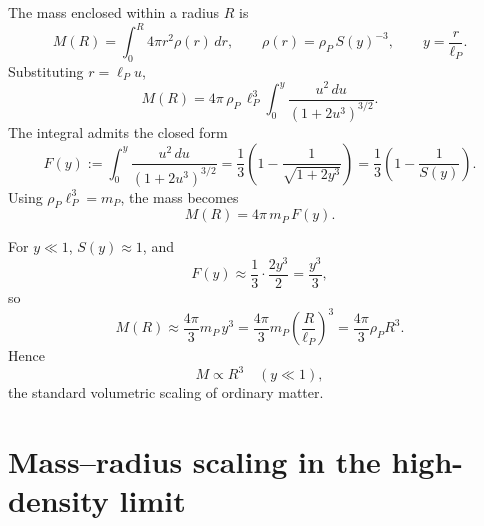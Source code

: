 \documentclass[a4paper,7pt,oneside,openany]{book}
\begin{document}
The mass enclosed within a radius $R$ is
\begin{equation}
M(R)=\int_{0}^{R}4\pi r^{2}\rho(r)\,dr,
\qquad
\rho(r)=\rho_{P}\,S(y)^{-3},
\qquad
y=\frac{r}{\ell_{P}}.
\label{eq:M-integral}
\end{equation}
Substituting $r=\ell_{P}u$,
\begin{equation}
M(R)
=
4\pi\,\rho_{P}\,\ell_{P}^{3}
\int_{0}^{y}\frac{u^{2}\,du}{(1+2u^{3})^{3/2}}.
\label{eq:M-dimless}
\end{equation}
The integral admits the closed form
\begin{equation}
F(y)
:=
\int_{0}^{y}\frac{u^{2}\,du}{(1+2u^{3})^{3/2}}
=
\frac{1}{3}\left(1-\frac{1}{\sqrt{1+2y^{3}}}\right)
=
\frac{1}{3}\left(1-\frac{1}{S(y)}\right).
\label{eq:F-closed}
\end{equation}
Using $\rho_{P}\ell_{P}^{3}=m_{P}$, the mass becomes
\begin{equation}
\boxed{\;M(R)=4\pi\,m_{P}\,F(y).\;}
\label{eq:M-simple}
\end{equation}

For $y\ll 1$, $S(y)\approx 1$, and
\begin{equation}
F(y)\approx \frac{1}{3}\cdot\frac{2y^{3}}{2}=\frac{y^{3}}{3},
\label{eq:F-low}
\end{equation}
so
\begin{equation}
M(R)\approx \frac{4\pi}{3}m_{P}\,y^{3}
=
\frac{4\pi}{3}m_{P}\left(\frac{R}{\ell_{P}}\right)^{3}
=
\frac{4\pi}{3}\rho_{P}R^{3}.
\label{eq:M-low}
\end{equation}
Hence
\begin{equation}
\boxed{\;M\propto R^{3}\quad (y\ll 1),\;}
\label{eq:scaling-cubic}
\end{equation}
the standard volumetric scaling of ordinary matter.

\section{Mass--radius scaling in the high-density limit}
\end{document}
